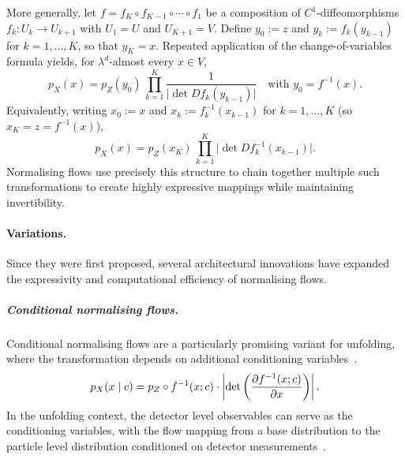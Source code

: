 More generally, let $f=f_K\circ f_{K-1}\circ\cdots\circ f_1$ be a composition of
$C^1$-diffeomorphisms $f_k:U_k\to U_{k+1}$ with $U_1=U$ and $U_{K+1}=V$.
Define $y_0:=z$ and $y_k:=f_k(y_{k-1})$ for $k=1,\dots,K$, so that $y_K=x$.
Repeated application of the change-of-variables formula yields, for
$\lambda^d$-almost every $x\in V$,
\[
p_X(x)
= p_Z(y_0)\,\prod_{k=1}^K \frac{1}{\bigl|\det D f_k(y_{k-1})\bigr|}
\quad\text{with } y_0=f^{-1}(x).
\]
Equivalently, writing $x_0:=x$ and $x_k:=f_k^{-1}(x_{k-1})$ for $k=1,\dots,K$
(so $x_K=z=f^{-1}(x)$),
\[
p_X(x)
= p_Z(x_K)\,\prod_{k=1}^K \bigl|\det D f_k^{-1}(x_{k-1})\bigr|.
\]
            Normalising flows use precisely this structure to chain together multiple such transformations to create highly expressive mappings while maintaining invertibility.
            
        \paragraph{Variations.}
            Since they were first proposed, several architectural innovations have expanded the expressivity and computational efficiency of normalising flows.
            
            \subparagraph[Conditional normalising flows]{Conditional normalising flows.}
            \label{subpar:conditional-nfs}
                Conditional normalising flows are a particularly promising variant for unfolding, where the transformation depends on additional conditioning variables~\cite{Winkler2019LearningFlows}.
                \begin{equation}
                    p_X(x \mid c) = p_Z\circ f^{-1}(x; c) \cdot \left|\det\left(\frac{\partial f^{-1}(x; c)}{\partial x}\right)\right|.
                \end{equation}
                In the unfolding context, the detector level observables can serve as the conditioning variables, with the flow mapping from a base distribution to the particle level distribution conditioned on detector measurements~\cite{Vischia2020NewUnfolding, Algren2023FlowReweighting}.
                
